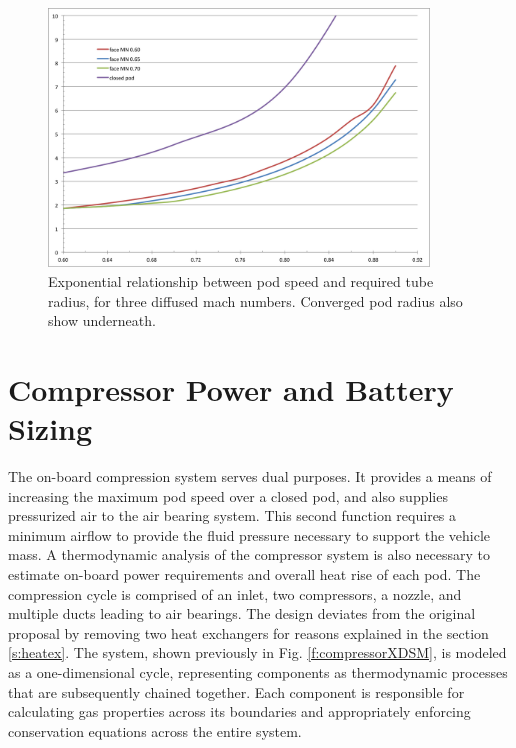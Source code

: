 \documentclass[heading.tex]{subfiles}
\begin{document}
\begin{figure}[H]
\centering
\includegraphics[width=0.9\textwidth]{images/mach_vs_rad4.png}
\caption[Tube and Pod Radius vs Mach]{Exponential relationship between pod speed and required tube radius, for three diffused mach numbers.
Converged pod radius also show underneath. }
\label{f:machRAD}
\end{figure}


\section{Compressor Power and Battery Sizing}
\label{sec:compressor-and-battery}

The on-board compression system serves dual purposes.
It provides a means of increasing the maximum pod speed over a closed pod, and also supplies pressurized air to the air bearing system.
This second function requires a minimum airflow to provide the fluid pressure necessary to support the vehicle mass.
A thermodynamic analysis of the compressor system is also necessary to
estimate on-board power requirements and overall heat rise of each pod.
The compression cycle is comprised of an inlet, two compressors, a nozzle, and multiple ducts leading to air bearings.
The design deviates from the original proposal by removing two heat exchangers for reasons explained in the section \ref{s:heatex}.
The system, shown previously in Fig. \ref{f:compressorXDSM}, is modeled as a one-dimensional cycle,
representing components as thermodynamic processes that are subsequently chained together.
Each component is responsible for calculating gas properties across its boundaries
and appropriately enforcing conservation equations across the entire system.
\end{document}
